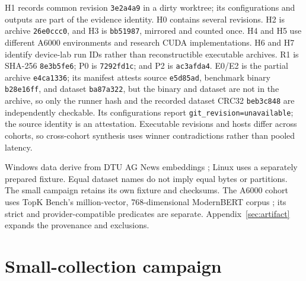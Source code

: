 \documentclass[10pt]{article}
\begin{document}
H1 records common revision \texttt{3e2a4a9} in a dirty worktree; its configurations and outputs are part of the evidence identity. H0 contains several revisions. H2 is archive \texttt{26e0ccc0}, and H3 is \texttt{bb51987}, mirrored and counted once. H4 and H5 use different A6000 environments and research CUDA implementations. H6 and H7 identify device-lab run IDs rather than reconstructible executable archives. R1 is SHA-256 \texttt{8e3b5fe6}; P0 is \texttt{7292fd1c}; and P2 is \texttt{ac3afda4}. E0/E2 is the partial archive \texttt{e4ca1336}; its manifest attests source \texttt{e5d85ad}, benchmark binary \texttt{b28e16ff}, and dataset \texttt{ba87a322}, but the binary and dataset are not in the archive, so only the runner hash and the recorded dataset CRC32 \texttt{beb3c848} are independently checkable. Its configurations report \texttt{git\_revision=unavailable}; the source identity is an attestation. Executable revisions and hosts differ across cohorts, so cross-cohort synthesis uses winner contradictions rather than pooled latency.

Windows data derive from DTU AG News embeddings \citep{nielsen2022agnews}; Linux uses a separately prepared fixture. Equal dataset names do not imply equal bytes or partitions. The small campaign retains its own fixture and checksums. The A6000 cohort uses TopK Bench's million-vector, 768-dimensional ModernBERT corpus \citep{topkbench}; its strict and provider-compatible predicates are separate. Appendix~\ref{sec:artifact} expands the provenance and exclusions.
\section{Small-collection campaign}
\end{document}
